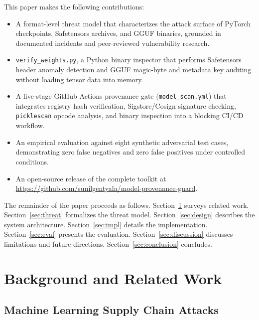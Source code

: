 \documentclass[sigconf,review]{acmart}
\begin{document}
This paper makes the following contributions:

\begin{itemize}
  \item A format-level threat model that characterizes the attack surface
    of PyTorch checkpoints, Safetensors archives, and GGUF binaries, grounded
    in documented incidents and peer-reviewed vulnerability research.
  \item \texttt{verify\_weights.py}, a Python binary inspector that performs
    Safetensors header anomaly detection and GGUF magic-byte and metadata
    key auditing without loading tensor data into memory.
  \item A five-stage GitHub Actions provenance gate
    (\texttt{model\_scan.yml}) that integrates registry hash verification,
    Sigstore/Cosign signature checking, \texttt{picklescan} opcode analysis,
    and binary inspection into a blocking CI/CD workflow.
  \item An empirical evaluation against eight synthetic adversarial test
    cases, demonstrating zero false negatives and zero false positives under
    controlled conditions.
  \item An open-source release of the complete toolkit at
    \url{https://github.com/sunilgentyala/model-provenance-guard}.
\end{itemize}

The remainder of the paper proceeds as follows. Section~\ref{sec:background}
surveys related work. Section~\ref{sec:threat} formalizes the threat model.
Section~\ref{sec:design} describes the system architecture. Section~\ref{sec:impl}
details the implementation. Section~\ref{sec:eval} presents the evaluation.
Section~\ref{sec:discussion} discusses limitations and future directions.
Section~\ref{sec:conclusion} concludes.

\section{Background and Related Work}
\label{sec:background}

\subsection{Machine Learning Supply Chain Attacks}
\end{document}
